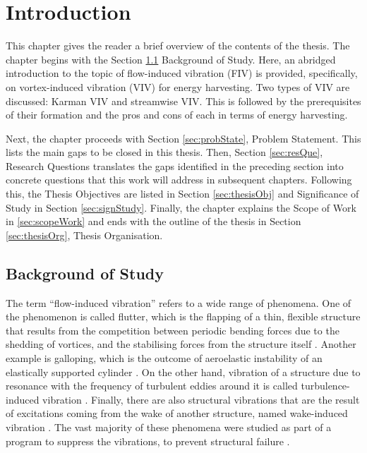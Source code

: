 \documentclass[oneside]{utmthesis}
\begin{document}
\listofappendices


\mainmatter

\captionsetup[figure]{labelsep=quad}
\captionsetup[table]{labelsep=quad}

\chapter{Introduction} \label{chap:introduction}
This chapter gives the reader a brief overview of the contents of the thesis. The chapter begins with the Section \ref{sec:backStudy} Background of Study. Here, an abridged introduction to the topic of flow-induced vibration (FIV) is provided, specifically, on vortex-induced vibration (VIV) for energy harvesting. Two types of VIV are discussed: Karman VIV and streamwise VIV. This is followed by the prerequisites of their formation and the pros and cons of each in terms of energy harvesting.

Next, the chapter proceeds with Section \ref{sec:probState}, Problem Statement. This lists the main gaps to be closed in this thesis. Then, Section \ref{sec:resQue}, Research Questions translates the gaps identified in the preceding section into concrete questions that this work will address in subsequent chapters. Following this, the Thesis Objectives are listed in Section \ref{sec:thesisObj} and Significance of Study in Section \ref{sec:signStudy}. Finally, the chapter explains the Scope of Work in \ref{sec:scopeWork} and ends with the outline of the thesis in Section \ref{sec:thesisOrg}, Thesis Organisation.

\section{Background of Study} \label{sec:backStudy}

\vspace{\baselineskip}

The term “flow-induced vibration” refers to a wide range of phenomena. One of the phenomenon is called flutter, which is the flapping of a thin, flexible structure that results from the competition between periodic bending forces due to the shedding of vortices, and the stabilising forces from the structure itself \citep{Xia2015a}. Another example is galloping, which is the outcome of aeroelastic instability of an elastically supported cylinder \citep{Kluger2013}. On the other hand, vibration of a structure due to resonance with the frequency of turbulent eddies around it is called turbulence-induced vibration \citep{Nakamura2013}. Finally, there are also structural vibrations that are the result of excitations coming from the wake of another structure, named wake-induced vibration \citep{Derakhshandeh2014}. The vast majority of these phenomena were studied as part of a program to suppress the vibrations, to prevent structural failure \citep{Khalak1999}.
\end{document}
